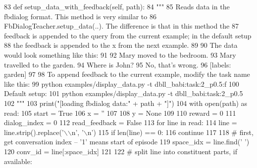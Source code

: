 \begin{DoxyCode}
83     \textcolor{keyword}{def }setup\_data\_with\_feedback(self, path):
84         \textcolor{stringliteral}{"""}
85 \textcolor{stringliteral}{        Reads data in the fbdialog format. This method is very similar to}
86 \textcolor{stringliteral}{        FbDialogTeacher.setup\_data(..). The difference is that in this method the}
87 \textcolor{stringliteral}{        feedback is appended to the query from the current example; in the default setup}
88 \textcolor{stringliteral}{        the feedback is appended to the x from the next example.}
89 \textcolor{stringliteral}{}
90 \textcolor{stringliteral}{        The data would look something like this:}
91 \textcolor{stringliteral}{}
92 \textcolor{stringliteral}{        Mary moved to the bedroom.}
93 \textcolor{stringliteral}{        Mary travelled to the garden.}
94 \textcolor{stringliteral}{        Where is John?}
95 \textcolor{stringliteral}{        No, that's wrong.}
96 \textcolor{stringliteral}{        [labels: garden]}
97 \textcolor{stringliteral}{}
98 \textcolor{stringliteral}{        To append feedback to the current example, modify the task name like this:}
99 \textcolor{stringliteral}{          python examples/display\_data.py -t dbll\_babi:task:2\_p0.5:f}
100 \textcolor{stringliteral}{        Default setup:}
101 \textcolor{stringliteral}{          python examples/display\_data.py -t dbll\_babi:task:2\_p0.5}
102 \textcolor{stringliteral}{        """}
103         print(\textcolor{stringliteral}{"[loading fbdialog data:"} + path + \textcolor{stringliteral}{"]"})
104         with open(path) \textcolor{keyword}{as} read:
105             start = \textcolor{keyword}{True}
106             x = \textcolor{stringliteral}{''}
107 
108             y = \textcolor{keywordtype}{None}
109 
110             reward = 0
111             dialog\_index = 0
112             read\_feedback = \textcolor{keyword}{False}
113             \textcolor{keywordflow}{for} line \textcolor{keywordflow}{in} read:
114                 line = line.strip().replace(\textcolor{stringliteral}{'\(\backslash\)\(\backslash\)n'}, \textcolor{stringliteral}{'\(\backslash\)n'})
115                 \textcolor{keywordflow}{if} len(line) == 0:
116                     \textcolor{keywordflow}{continue}
117 
118                 \textcolor{comment}{# first, get conversation index -- '1' means start of episode}
119                 space\_idx = line.find(\textcolor{stringliteral}{' '})
120                 conv\_id = line[:space\_idx]
121 
122                 \textcolor{comment}{# split line into constituent parts, if available:}

\end{DoxyCode}
